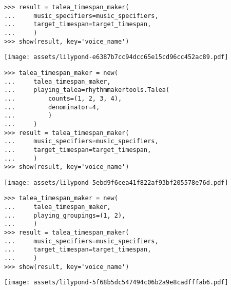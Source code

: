 \begin{singlespacing}
\vspace{-0.5\baselineskip}
\begin{lstlisting}
>>> result = talea_timespan_maker(
...     music_specifiers=music_specifiers,
...     target_timespan=target_timespan,
...     )
>>> show(result, key='voice_name')
\end{lstlisting}
\noindent\texttt{[image: assets/lilypond-e6387b7cc94dcc65e15cd96cc452ac89.pdf]}
\end{singlespacing}

\begin{comment}
<abjad>
talea_timespan_maker = new(
    talea_timespan_maker,
    playing_talea=rhythmmakertools.Talea(
        counts=(1, 2, 3, 4),
        denominator=4,
        )
    )
result = talea_timespan_maker(
    music_specifiers=music_specifiers,
    target_timespan=target_timespan,
    )
show(result, key='voice_name')
</abjad>
\end{comment}

\begin{singlespacing}
\vspace{-0.5\baselineskip}
\begin{lstlisting}
>>> talea_timespan_maker = new(
...     talea_timespan_maker,
...     playing_talea=rhythmmakertools.Talea(
...         counts=(1, 2, 3, 4),
...         denominator=4,
...         )
...     )
>>> result = talea_timespan_maker(
...     music_specifiers=music_specifiers,
...     target_timespan=target_timespan,
...     )
>>> show(result, key='voice_name')
\end{lstlisting}
\noindent\texttt{[image: assets/lilypond-5ebd9f6cea41f822af93bf205578e76d.pdf]}
\end{singlespacing}

\begin{comment}
<abjad>
talea_timespan_maker = new(
    talea_timespan_maker,
    playing_groupings=(1, 2),
    )
result = talea_timespan_maker(
    music_specifiers=music_specifiers,
    target_timespan=target_timespan,
    )
show(result, key='voice_name')
</abjad>
\end{comment}

\begin{singlespacing}
\vspace{-0.5\baselineskip}
\begin{lstlisting}
>>> talea_timespan_maker = new(
...     talea_timespan_maker,
...     playing_groupings=(1, 2),
...     )
>>> result = talea_timespan_maker(
...     music_specifiers=music_specifiers,
...     target_timespan=target_timespan,
...     )
>>> show(result, key='voice_name')
\end{lstlisting}
\noindent\texttt{[image: assets/lilypond-5f68b5dc547494c06b2a9e8cadfffab6.pdf]}
\end{singlespacing}


